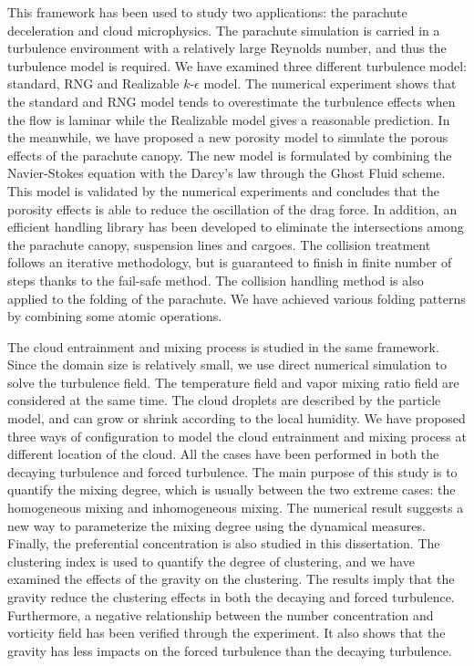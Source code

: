 This framework has been used to study two applications: the parachute deceleration and cloud microphysics. The parachute simulation is carried in a turbulence environment with a relatively large Reynolds number, and thus the turbulence model is required. We have examined three different turbulence model: standard, RNG and Realizable $k$-$\epsilon$ model. The numerical experiment shows that the standard and RNG model tends to overestimate the turbulence effects when the flow is laminar while the Realizable model gives a reasonable prediction. In the meanwhile, we have proposed a new porosity model to simulate the porous effects of the parachute canopy. The new model is formulated by combining the Navier-Stokes equation with the Darcy's law through the Ghost Fluid scheme. This model is validated by the numerical experiments and concludes that the porosity effects is able to reduce the oscillation of the drag force. In addition, an efficient handling library has been developed to eliminate the intersections among the parachute canopy, suspension lines and cargoes. The collision treatment follows an iterative methodology, but is guaranteed to finish in finite number of steps thanks to the fail-safe method. The collision handling method is also applied to the folding of the parachute. We have achieved various folding patterns by combining some atomic operations.

The cloud entrainment and mixing process is studied in the same framework. Since the domain size is relatively small, we use direct numerical simulation to solve the turbulence field. The temperature field and vapor mixing ratio field are considered at the same time. The cloud droplets are described by the particle model, and can grow or shrink according to the local humidity. We have proposed three ways of configuration to model the cloud entrainment and mixing process at different location of the cloud. All the cases have been performed in both the decaying turbulence and forced turbulence. The main purpose of this study is to quantify the mixing degree, which is usually between the two extreme cases: the homogeneous mixing and inhomogeneous mixing. The numerical result suggests a new way to parameterize the mixing degree using the dynamical measures. Finally, the preferential concentration is also studied in this dissertation. The clustering index is used to quantify the degree of clustering, and we have examined the effects of the gravity on the clustering. The results imply that the gravity reduce the clustering effects in both the decaying and forced turbulence. Furthermore, a negative relationship between the number concentration and vorticity field has been verified through the experiment. It also shows that the gravity has less impacts on the forced turbulence than the decaying turbulence.
 
